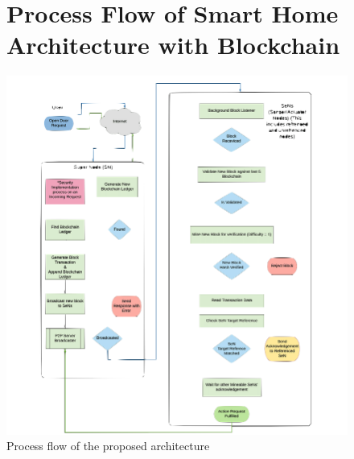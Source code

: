 \begin{appendices}
\begin{figure}[ht!]
        \section{Process Flow of Smart Home Architecture with Blockchain \cite{arifEtAl_2020}}
        \label{sec:process-flow-of-smart-home-architecture-with-blockchain}
        \includegraphics[width=\linewidth]{datasets/images/A4}
        \caption{Process flow of the proposed architecture}\label{fig:figure7}
        \cleardoublepage
    \end{figure}

    \begin{figure}[ht!]

\end{figure}
\end{appendices}
